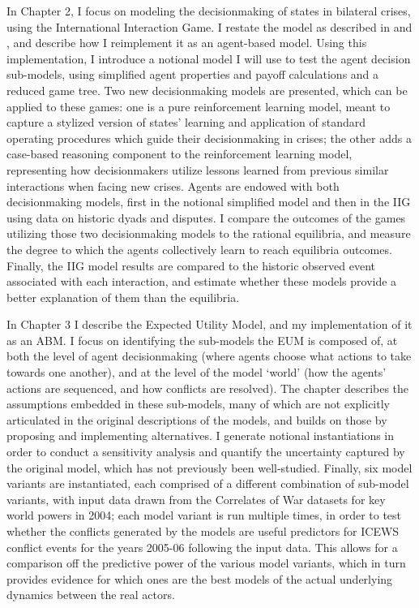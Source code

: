 In Chapter 2, I focus on modeling the decisionmaking of states in bilateral crises, using the International Interaction Game. I restate the model as described in \citet{bdm_1992} and \citet{bennett_2000}, and describe how I reimplement it as an agent-based model. Using this implementation, I introduce a notional model I will use to test the agent decision sub-models, using simplified agent properties and payoff calculations and a reduced game tree. Two new decisionmaking models are presented, which can be applied to these games: one is a pure reinforcement learning model, meant to capture a stylized version of states' learning and application of standard operating procedures which guide their decisionmaking in crises; the other adds a case-based reasoning component to the reinforcement learning model, representing how decisionmakers utilize lessons learned from previous similar interactions when facing new crises. Agents are endowed with both decisionmaking models, first in the notional simplified model and then in the IIG using data on historic dyads and disputes. I compare the outcomes of the games utilizing those two decisionmaking models to the rational equilibria, and measure the degree to which the agents collectively learn to reach equilibria outcomes. Finally, the IIG model results are compared to the historic observed event associated with each interaction, and estimate whether these models provide a better explanation of them than the equilibria.

In Chapter 3 I describe the Expected Utility Model, and my implementation of it as an ABM. I focus on identifying the sub-models the EUM is composed of, at both the level of agent decisionmaking (where agents choose what actions to take towards one another), and at the level of the model `world' (how the agents' actions are sequenced, and how conflicts are resolved). The chapter describes the assumptions embedded in these sub-models, many of which are not explicitly articulated in the original descriptions of the models, and builds on those by proposing and implementing alternatives. I generate notional instantiations in order to conduct a sensitivity analysis and quantify the uncertainty captured by the original model, which has not previously been well-studied. Finally, six model variants are instantiated, each comprised of a different combination of sub-model variants, with input data drawn from the Correlates of War datasets for key world powers in 2004; each model variant is run multiple times, in order to test whether the conflicts generated by the models are useful predictors for ICEWS conflict events for the years 2005-06 following the input data. This allows for a comparison off the predictive power of the various model variants, which in turn provides evidence for which ones are the best models of the actual underlying dynamics between the real actors.

